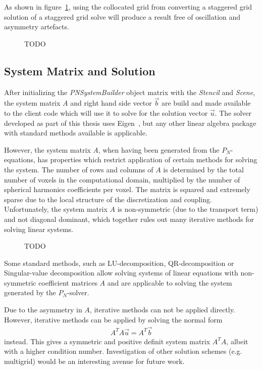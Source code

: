 As shown in figure~\ref{fig:pn_staggered_grid_noartefacts}, using the collocated grid from converting a staggered grid solution of a staggered grid solve will produce a result free of oscillation and asymmetry artefacts.
\begin{figure}[h]
\centering
{}
\caption{TODO}
\label{fig:pn_staggered_grid_noartefacts}
\end{figure}

\subsection{System Matrix and Solution}
\label{sec:pn_system_matrix}

After initializing the \emph{PNSystemBuilder} object matrix with the \emph{Stencil} and \emph{Scene}, the system matrix $A$ and right hand side vector $\vec{b}$ are build and made available to the client code which will use it to solve for the solution vector $\vec{u}$. The solver developed as part of this thesis uses Eigen~\cite{Eigen}, but any other linear algebra package with standard methods available is applicable. 

However, the system matrix $A$, when having been generated from the $P_N$-equations, has properties which restrict application of certain methods for solving the system. The number of rows and columns of $A$ is determined by the total number of voxels in the computational domain, multiplied by the number of spherical harmonics coefficients per voxel. The matrix is squared and extremely sparse due to the local structure of the discretization and coupling. Unfortunately, the system matrix $A$ is non-symmetric (due to the transport term) and not diagonal dominant, which together rules out many iterative methods for solving linear systems.
\begin{figure}[h]
\centering
{}
\caption{TODO}
\label{fig:pn_matrix_layout}
\end{figure}

Some standard methods, such as LU-decomposition, QR-decomposition or Singular-value decomposition allow solving systems of linear equations with non-symmetric coefficient matrices $A$ and are applicable to solving the system generated by the $P_N$-solver. 

Due to the asymmetry in $A$, iterative methods can not be applied directly. However, iterative methods can be applied by solving the normal form
\begin{align}
A^TA\vec{u} = A^T\vec{b}
\end{align}
instead. This gives a symmetric and positive definit system matrix $A^TA$, albeit with a higher condition number. Investigation of other solution schemes (e.g. multigrid) would be an interesting avenue for future work.

